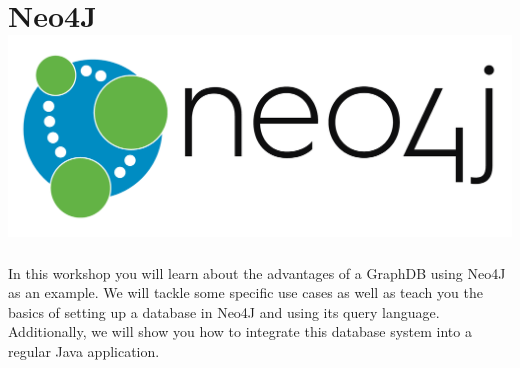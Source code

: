 
\section*{Neo4J\hfill\includegraphics[width=.35\linewidth]{images/neo4j_logo.png}}
In this workshop you will learn about the advantages of a GraphDB using Neo4J as an example. We will tackle some specific use cases as well as teach you the basics of setting up a database in Neo4J and using its query language.
Additionally, we will show you how to integrate this database system into a regular Java application.

